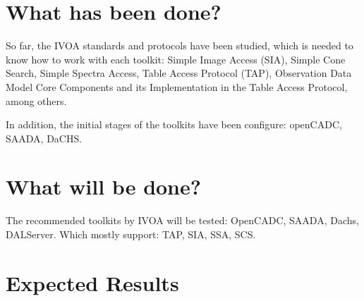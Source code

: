\section{What has been done?}



So far, the IVOA standards and protocols have been studied, which is needed to know how to
work with each toolkit: Simple Image Access (SIA), Simple Cone Search, Simple
Spectra Access, Table Access Protocol (TAP), Observation Data Model Core
Components and its Implementation in the Table Access Protocol, among others.

In addition, the initial stages of the toolkits have been configure: openCADC,
SAADA, DaCHS.

\section{What will be done?}


The recommended toolkits by IVOA will be tested: OpenCADC, SAADA, Dachs,
DALServer. Which mostly support: TAP, SIA, SSA, SCS.

\section{Expected Results}


